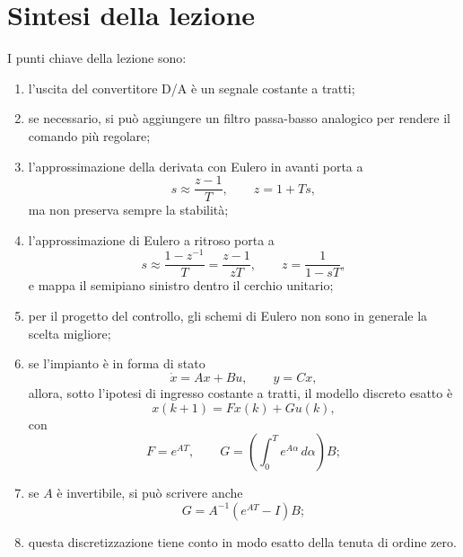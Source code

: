 \section{Sintesi della lezione}

I punti chiave della lezione sono:
\begin{enumerate}
    \item l'uscita del convertitore D/A \`e un segnale costante a tratti;
    \item se necessario, si pu\`o aggiungere un filtro passa-basso analogico per rendere il comando pi\`u regolare;
    \item l'approssimazione della derivata con Eulero in avanti porta a
    \[
    s\approx \frac{z-1}{T},
    \qquad
    z=1+Ts,
    \]
    ma non preserva sempre la stabilit\`a;
    \item l'approssimazione di Eulero a ritroso porta a
    \[
    s\approx \frac{1-z^{-1}}{T}
    =
    \frac{z-1}{zT},
    \qquad
    z=\frac{1}{1-sT},
    \]
    e mappa il semipiano sinistro dentro il cerchio unitario;
    \item per il progetto del controllo, gli schemi di Eulero non sono in generale la scelta migliore;
    \item se l'impianto \`e in forma di stato
    \[
    \dot x=Ax+Bu,\qquad y=Cx,
    \]
    allora, sotto l'ipotesi di ingresso costante a tratti, il modello discreto esatto \`e
    \[
    x(k+1)=Fx(k)+Gu(k),
    \]
    con
    \[
    F=e^{AT},
    \qquad
    G=\left(\int_0^T e^{A\alpha}\,d\alpha\right)B;
    \]
    \item se \(A\) \`e invertibile, si pu\`o scrivere anche
    \[
    G=A^{-1}(e^{AT}-I)B;
    \]
    \item questa discretizzazione tiene conto in modo esatto della tenuta di ordine zero.
\end{enumerate}